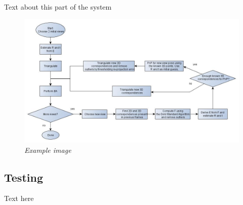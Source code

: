 Text about this part of the system


\begin{figure}[htb]
	\centering
	\includegraphics[width=160mm]{images/example1.jpg}
	\caption[This text ends up at the list of figures]{\textit{Example image}}
	\label{fig:block_overview_fig}  %
\end{figure}



\subsection{Testing}
Text here



